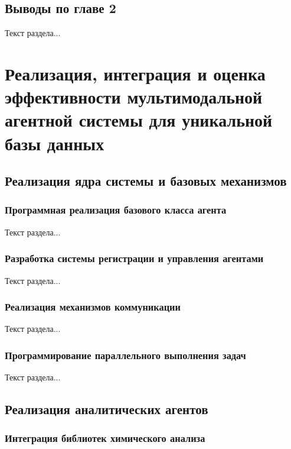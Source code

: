 \subsection{Выводы по главе 2}

Текст раздела...

\newpage

\section{Реализация, интеграция и оценка эффективности мультимодальной агентной системы для уникальной базы данных}

\subsection{Реализация ядра системы и базовых механизмов}

\subsubsection{Программная реализация базового класса агента}

Текст раздела...

\subsubsection{Разработка системы регистрации и управления агентами}

Текст раздела...

\subsubsection{Реализация механизмов коммуникации}

Текст раздела...

\subsubsection{Программирование параллельного выполнения задач}

Текст раздела...

\subsection{Реализация аналитических агентов}

\subsubsection{Интеграция библиотек химического анализа}

